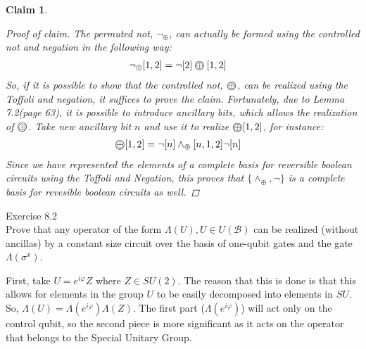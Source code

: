 \documentclass{exam} %
\newcommand{\cl}[1]{\mathcal{#1}}  %
\theoremstyle{plain}
\newtheorem{claim}[thm]{Claim}      \newtheorem*{claim*}{Claim}
\theoremstyle{definition}
\theoremstyle{remark}
\newenvironment{claimproof} {
  \begin{proof}[Proof of claim]
  \renewcommand{\qedsymbol}{\ensuremath{\bullet}}
  } {
  \end{proof}
  }
\numberwithin{equation}{section}  %
\renewcommand{\phi}{\varphi}
\newcommand\ooplus{\stackMath\mathbin{\stackinset{c}{0ex}{c}{0ex}{\oplus}{\bigcirc}}}
\begin{document}
\begin{questions}
\begin{solution}
\begin{claim}
\begin{claimproof}
        The permuted not, $\neg_{\oplus}$, can actually be formed using the 
        controlled not and negation in the following way:
        \begin{align*}
          \neg_{\oplus}[1,2] 
          &= \neg[2]\ooplus[1,2]
        \end{align*}
        So, if it is possible to show that the controlled not, $\ooplus$, can
        be realized using the Toffoli and negation, it suffices to prove 
        the claim. Fortunately, due to Lemma 7.2(page 63), it is possible 
        to introduce
        ancillary bits, which allows the realization of $\ooplus$. 
        Take new ancillary bit $n$ and use it to realize $\ooplus[1,2]$, 
        for instance:
        \begin{align*}
          \ooplus[1,2] &= \neg[n] \wedge_{\oplus}[n,1,2]\neg[n]
        \end{align*}
        Since we have represented the elements of a complete basis for reversible
        boolean circuits using the Toffoli and Negation, this proves that
        $\{\wedge_{\oplus}, \neg\}$ is a complete basis for revesible boolean
        circuits as well.
      \end{claimproof}
    \end{claim}
  \end{solution}
  \question Exercise 8.2\\
  Prove that any operator of the form $\Lambda(U), U \in U(\cl{B})$ can be
  realized (without ancillas) by a constant size circuit over the basis of 
  one-qubit gates and the gate $\Lambda(\sigma^x)$.
  \begin{solution}
    First, take $U = e^{i\phi}Z$ where $Z \in SU(2)$. The reason that this is done
    is that this allows for elements in the group $U$ to be easily decomposed 
    into elements in $SU$.\\

    So, $\Lambda(U) = 
    \Lambda(e^{i\phi})\Lambda(Z)$. The first part ($\Lambda(e^{i\phi})$) will
    act only on the control qubit, so the second piece is more significant as
    it acts on the operator that belongs to the Special Unitary Group.\\


\end{solution}
\end{questions}
\end{document}
